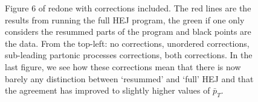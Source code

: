 \begin{figure}[t]
\caption{Figure 6 of \cite{Aad2011} redone with corrections included. The red lines are the results from running the full HEJ program, the green if one only considers the resummed parts of the program and black points are the data. From the top-left: no corrections, unordered corrections, sub-leading partonic processes corrections, both corrections. In the last figure, we see how these corrections mean that there is now barely any distinction between `resummed' and `full' HEJ and that the agreement has improved to slightly higher values of $\bar{p}_T$.}
\label{fig:veto}
\end{figure}

\begin{figure}[t]
\centering
{}

\end{figure}
